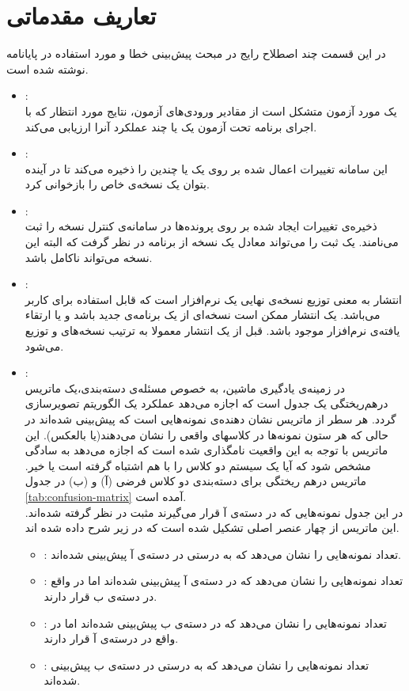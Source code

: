 \section{ تعاریف مقدماتی}
\label{sec:terms}
در این قسمت چند اصطلاح رایج در مبحث پیش‌بینی‌ خطا و مورد استفاده در پایانامه نوشته شده است.
\begin{itemize}
	\item 
	: \\
	یک مورد آزمون متشکل است از مقادیر ورودی‌های آزمون، نتایج مورد انتظار که با اجرای برنامه تحت آزمون یک یا چند عملکرد آنرا ارزیابی می‌کند. 
	\item
	:\\
	این سامانه تغییرات اعمال شده بر روی یک یا چندین  را ذخیره می‌کند تا در آینده بتوان یک نسخه‌ی خاص را بازخوانی کرد. 
	\item
	:\\
	ذخیره‌ی تغییرات ایجاد شده بر روی پرونده‌ها در سامانه‌ی کنترل نسخه‌ را ثبت می‌نامند. یک ثبت را می‌تواند معادل یک نسخه از برنامه در نظر گرفت که البته این نسخه می‌تواند ناکامل باشد.
	\item
	:\\
	انتشار به معنی توزیع نسخه‌ی نهایی یک نرم‌افزار است که قابل استفاده برای کاربر می‌باشد. یک انتشار ممکن است نسخه‌ای از یک برنامه‌ی جدید باشد و یا ارتقاء یافته‌ی نرم‌افزار موجود باشد. قبل از یک انتشار معمولا به ترتیب نسخه‌های  و  توزیع می‌شود. 
	\item
	:\\
	در زمینه‌ی یادگیری ماشین، به خصوص مسئله‌ی دسته‌بندی،یک ماتریس درهم‌ریختگی یک جدول است که اجازه می‌دهد عملکرد یک الگوریتم تصویر‌سازی گردد. هر سطر از ماتریس نشان دهنده‌ی نمونه‌هایی است که پیش‌بینی شده‌اند در حالی که هر ستون نمونه‌ها در کلاسهای واقعی را نشان می‌دهند(یا بالعکس). این ماتریس با توجه به این واقعیت نامگذاری شده است که اجازه می‌دهد به سادگی مشخص شود که آیا یک سیستم دو کلاس را با هم اشتباه گرفته است یا خیر. ماتریس درهم ریختگی برای دسته‌بندی دو کلاس فرضی (آ) و (ب) در جدول \ref{tab:confusion-matrix} آمده است. \\
	در این جدول نمونه‌هایی که در دسته‌ی آ قرار می‌گیرند مثبت در نظر گرفته شده‌اند. این ماتریس از چهار عنصر اصلی تشکیل شده است که در زیر شرح داده شده اند. 
	\begin{itemize}
		\item 
		: تعداد نمونه‌هایی را نشان می‌دهد که به درستی در دسته‌ی آ پیش‌بینی شده‌اند.
		\item
		: تعداد نمونه‌هایی را نشان می‌دهد که در دسته‌ی آ پیش‌بینی شده‌اند اما در واقع در دسته‌ی ب قرار دارند.
		\item
		: تعداد نمونه‌هایی را نشان می‌دهد که در دسته‌ی ب پیش‌بینی شده‌اند اما در واقع در درسته‌ی آ قرار دارند.
		\item
		: تعداد نمونه‌هایی را نشان می‌دهد که به درستی در دسته‌ی ب پیش‌بینی شده‌اند.
	\end{itemize}
	
\end{itemize}	

